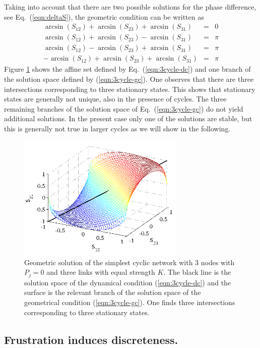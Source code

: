 \documentclass[10pt,aps,pra,onecolumn,superscriptaddress]{revtex4-1}
\newcommand{\bea}{\begin{eqnarray}}
\newcommand{\eea}{\end{eqnarray}}
\newcommand{\nn}{\nonumber}
\begin{document}
Taking into account that there are two possible solutions for the
phase difference, see Eq.~(\ref{eqn:deltaS}), the geometric condition
can be written as
\bea
      \arcsin(S_{12}) + \arcsin(S_{23}) +  \arcsin(S_{31}) &=& 0    \nn \\ 
      \arcsin(S_{12}) + \arcsin(S_{23})  -  \arcsin(S_{31}) &=& \pi \nn \\ 
      \arcsin(S_{12}) - \arcsin(S_{23})  + \arcsin(S_{31}) &=& \pi \nn \\ 
   - \arcsin(S_{12}) + \arcsin(S_{23})  +  \arcsin(S_{31}) &=& \pi  
   \label{eqn:3cycle-gc} 
\eea 
Figure \ref{fig:cycle3} shows the affine set defined by 
Eq.~(\ref{eqn:3cycle-dc})  and one branch of the solution
space defined by  (\ref{eqn:3cycle-gc}). One observes that 
there are three intersections corresponding to 
three stationary states. This shows that stationary
states are generally not unique, also in the presence
of cycles.
The three remaining branches of the solution space
of Eq.~(\ref{eqn:3cycle-gc}) do not yield additional
solutions.
In the present case only one of the solutions are stable,
but this is generally not true in larger cycles as we will
show in the following.


\begin{figure}[tb]
\centering
\includegraphics[width=8cm, angle=0]{pics/cycle3b.png}
\caption{\label{fig:cycle3}
Geometric solution of the simplest cyclic network with
3 nodes with $P_j=0$ and three links with equal
strength $K$.
The black line is the solution space of the dynamical 
condition (\ref{eqn:3cycle-dc}) and the surface is the
relevant branch of the solution space of the geometrical
condition (\ref{eqn:3cycle-gc}). One finds three intersections 
corresponding to three stationary states.
}
\end{figure}

\subsection{Frustration induces discreteness.} 
\label{eqn:sec-cycle}
\end{document}
